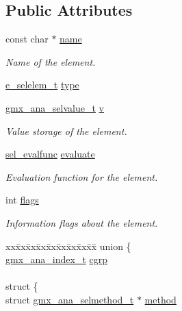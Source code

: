 \subsection*{\-Public \-Attributes}
\begin{DoxyCompactItemize}
\item 
const char $\ast$ \hyperlink{structt__selelem_aea908029a2d5c85e438afb11451be9ba}{name}
\begin{DoxyCompactList}\small\item\em \-Name of the element. \end{DoxyCompactList}\item 
\hyperlink{selelem_8h_a1f104d5c71b1198ef51acc4ef016ae46}{e\-\_\-selelem\-\_\-t} \hyperlink{structt__selelem_a092a85a68970855e3ee5ee48e32c809f}{type}
\item 
\hyperlink{structgmx__ana__selvalue__t}{gmx\-\_\-ana\-\_\-selvalue\-\_\-t} \hyperlink{structt__selelem_abbc88b4abc239e042a19414691763ae9}{v}
\begin{DoxyCompactList}\small\item\em \-Value storage of the element. \end{DoxyCompactList}\item 
\hyperlink{selelem_8h_a69c287b69b10372680bbecd6e49a1d9f}{sel\-\_\-evalfunc} \hyperlink{structt__selelem_a5e0082a02a156c2d010414490f94d227}{evaluate}
\begin{DoxyCompactList}\small\item\em \-Evaluation function for the element. \end{DoxyCompactList}\item 
int \hyperlink{structt__selelem_adda179aca4efb2083ea41e01f10f6b50}{flags}
\begin{DoxyCompactList}\small\item\em \-Information flags about the element. \end{DoxyCompactList}\item 
\begin{tabbing}
xx\=xx\=xx\=xx\=xx\=xx\=xx\=xx\=xx\=\kill
union \{\\
\>\hyperlink{structgmx__ana__index__t}{gmx\_ana\_index\_t} \hyperlink{structt__selelem_a3a5dd87256665de44876390abcb0eaba}{cgrp}\\
\>\\
\>struct \{\\
\>\>struct \hyperlink{structgmx__ana__selmethod__t}{gmx\_ana\_selmethod\_t} $\ast$ \hyperlink{structt__selelem_ab84029573c8caca4cc50d3dc290d3047}{method}\\

\end{tabbing}
\end{DoxyCompactItemize}
